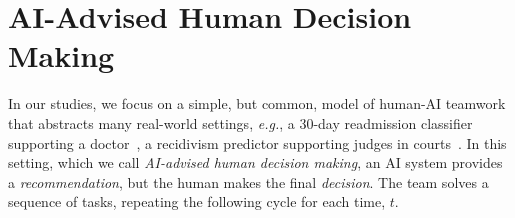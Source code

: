 \documentclass[letterpaper]{article} %
\newcommand{\eg}{\mbox{\it e.g.}}
\newcommand{\?}{\mbox{?}}
\newcommand{\name}{AI-advised human decision making}
\begin{document}
\begin{itemize}
\end{itemize}


\section{AI-Advised Human Decision Making}

In our studies, we focus on a simple, but common, model of human-AI teamwork that abstracts many real-world settings,
\eg, a 30-day readmission classifier supporting a doctor~\cite{bayati2014data}, a recidivism predictor supporting judges in courts~\cite{angwin2016machine}. In this setting, which we call {\em \name}, an AI 
system provides a {\em recommendation}, but the human makes the final {\em decision}.
The team solves a sequence of tasks, repeating the following cycle for each time, $t$.
\end{document}
